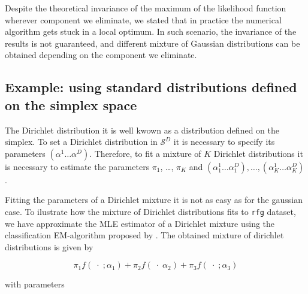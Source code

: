 \documentclass[10pt, a4paper]{article}
\begin{document}
Despite the theoretical invariance of the maximum of the likelihood function wherever component we eliminate, we stated that in practice the numerical algorithm gets stuck in a local optimum. In such scenario, the invariance of the results is not guaranteed, and different mixture of Gaussian distributions can be obtained depending on the component we eliminate. 



\subsection*{Example: using standard distributions defined on the simplex space}

The Dirichlet distribution it is well kwown as a distribution defined on the simplex. To set a Dirichlet distribution in $\mathcal{S}^D$ it is necessary to specify its parameters $\left( \alpha^1 \dots \alpha^D \right)$. Therefore, to fit a mixture of $K$ Dirichlet distributions it is necessary to estimate the parameters $\pi_1$, \dots, $\pi_K$ and $\left( \alpha^1_1 \dots \alpha^D_1 \right), \dots, \left( \alpha^1_K \dots \alpha^D_K \right)$.

Fitting the parameters of a Dirichlet mixture it is not as easy as for the gaussian case. To ilustrate how the mixture of Dirichlet distributions fits to \texttt{rfg} dataset, we have approximate the MLE estimator of a Dirichlet mixture using the classification EM-algorithm proposed by \cite{celeux1992classification}. The obtained mixture of dirichlet distributions is given by

\[
\pi_1 f(\;\cdot\; ; \alpha_1) + \pi_2 f(\;\cdot\; \alpha_2) + \pi_3 f(\;\cdot\; ; \alpha_3)
\]

with parameters

{\small  }


\end{document}
